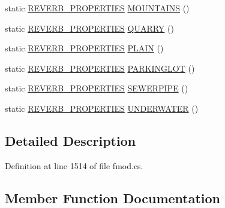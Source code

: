 \begin{DoxyCompactItemize}
\item 
static \hyperlink{struct_f_m_o_d_1_1_r_e_v_e_r_b___p_r_o_p_e_r_t_i_e_s}{R\+E\+V\+E\+R\+B\+\_\+\+P\+R\+O\+P\+E\+R\+T\+I\+ES} \hyperlink{class_f_m_o_d_1_1_p_r_e_s_e_t_a423a485c6d240e705c110c31ed0d9b21}{M\+O\+U\+N\+T\+A\+I\+NS} ()
\item 
static \hyperlink{struct_f_m_o_d_1_1_r_e_v_e_r_b___p_r_o_p_e_r_t_i_e_s}{R\+E\+V\+E\+R\+B\+\_\+\+P\+R\+O\+P\+E\+R\+T\+I\+ES} \hyperlink{class_f_m_o_d_1_1_p_r_e_s_e_t_a47482de1ffe1d96cf26443d831d42008}{Q\+U\+A\+R\+RY} ()
\item 
static \hyperlink{struct_f_m_o_d_1_1_r_e_v_e_r_b___p_r_o_p_e_r_t_i_e_s}{R\+E\+V\+E\+R\+B\+\_\+\+P\+R\+O\+P\+E\+R\+T\+I\+ES} \hyperlink{class_f_m_o_d_1_1_p_r_e_s_e_t_a2b657d2b5240f359752ad6058a8f86c8}{P\+L\+A\+IN} ()
\item 
static \hyperlink{struct_f_m_o_d_1_1_r_e_v_e_r_b___p_r_o_p_e_r_t_i_e_s}{R\+E\+V\+E\+R\+B\+\_\+\+P\+R\+O\+P\+E\+R\+T\+I\+ES} \hyperlink{class_f_m_o_d_1_1_p_r_e_s_e_t_a68fbe6cc90e5a4b82ffb49512ce42191}{P\+A\+R\+K\+I\+N\+G\+L\+OT} ()
\item 
static \hyperlink{struct_f_m_o_d_1_1_r_e_v_e_r_b___p_r_o_p_e_r_t_i_e_s}{R\+E\+V\+E\+R\+B\+\_\+\+P\+R\+O\+P\+E\+R\+T\+I\+ES} \hyperlink{class_f_m_o_d_1_1_p_r_e_s_e_t_ada14a6238378e3f2c615bbf62408627e}{S\+E\+W\+E\+R\+P\+I\+PE} ()
\item 
static \hyperlink{struct_f_m_o_d_1_1_r_e_v_e_r_b___p_r_o_p_e_r_t_i_e_s}{R\+E\+V\+E\+R\+B\+\_\+\+P\+R\+O\+P\+E\+R\+T\+I\+ES} \hyperlink{class_f_m_o_d_1_1_p_r_e_s_e_t_aaba513a279a8993c88ddf076ce2dabcf}{U\+N\+D\+E\+R\+W\+A\+T\+ER} ()
\end{DoxyCompactItemize}


\subsection{Detailed Description}


Definition at line 1514 of file fmod.\+cs.



\subsection{Member Function Documentation}
\mbox{\label{class_f_m_o_d_1_1_p_r_e_s_e_t_a4da51f2600a1c038a04647325c7713a1}} 
